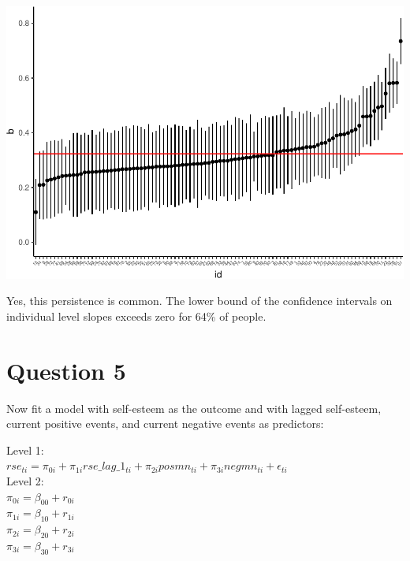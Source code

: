 \documentclass[]{article}
\newenvironment{Shaded}{\begin{snugshade}}{\end{snugshade}}
\newcommand{\KeywordTok}[1]{\textcolor[rgb]{0.13,0.29,0.53}{\textbf{#1}}}
\newcommand{\DataTypeTok}[1]{\textcolor[rgb]{0.13,0.29,0.53}{#1}}
\newcommand{\FloatTok}[1]{\textcolor[rgb]{0.00,0.00,0.81}{#1}}
\newcommand{\StringTok}[1]{\textcolor[rgb]{0.31,0.60,0.02}{#1}}
\newcommand{\OperatorTok}[1]{\textcolor[rgb]{0.81,0.36,0.00}{\textbf{#1}}}
\newcommand{\NormalTok}[1]{#1}
\begin{document}
\includegraphics{Beck_HW_7_R_2_files/figure-latex/unnamed-chunk-8-1.pdf}

\begin{Shaded}
\end{Shaded}

Yes, this persistence is common. The lower bound of the confidence
intervals on individual level slopes exceeds zero for 64\% of people.

\section{Question 5}\label{question-5}

Now fit a model with self-esteem as the outcome and with lagged
self-esteem, current positive events, and current negative events as
predictors:

Level 1:\\
\(rse_{ti} = \pi_{0i} + \pi_{1i}rse\_lag\_1_{ti} + \pi_{2i}posmn_{ti} + \pi_{3i}negmn_{ti} + \epsilon_{ti}\)\\
Level 2:\\
\(\pi_{0i} = \beta_{00} + r_{0i}\)\\
\(\pi_{1i} = \beta_{10} + r_{1i}\)\\
\(\pi_{2i} = \beta_{20} + r_{2i}\)\\
\(\pi_{3i} = \beta_{30} + r_{3i}\)
\end{document}
